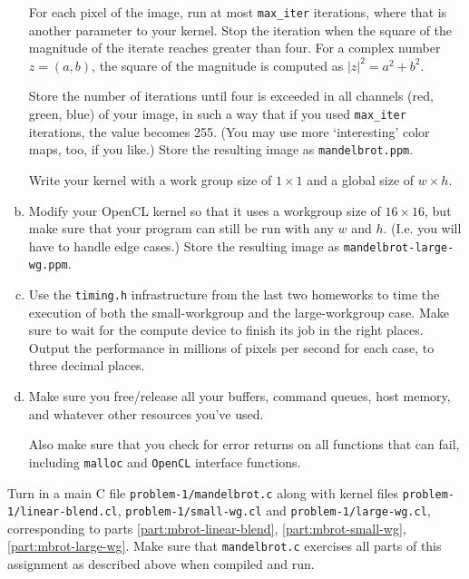 \documentclass[11pt]{article}
\begin{document}
\begin{enumerate}[a)]
    For each pixel of the image, run at most \texttt{max\_iter}
    iterations, where that is another parameter to your kernel. Stop
    the iteration when the square of the magnitude of the iterate
    reaches greater than four. For a complex number $z=(a,b)$, the
    square of the magnitude is computed as $|z|^2=a^2+b^2$.

    Store the number of iterations until four is exceeded in all
    channels (red, green, blue) of your image, in such a way that if
    you used \texttt{max\_iter} iterations, the value becomes 255.
    (You may use more `interesting' color maps, too, if you like.)
    Store the resulting image as \texttt{mandelbrot.ppm}.

    Write your kernel with a work group size of $1\times 1$ and a
    global size of $w\times h$.
    \label{part:mbrot-small-wg}

  \item Modify your OpenCL kernel so that it uses a workgroup size of
    $16\times 16$, but make sure that your program can still be run
    with any $w$ and $h$. (I.e. you will have to handle edge cases.)
    Store the resulting image as \texttt{mandelbrot-large-wg.ppm}.
    \label{part:mbrot-large-wg}

  \item Use the \texttt{timing.h} infrastructure from the last two
    homeworks to time the execution of both the small-workgroup and
    the large-workgroup case. Make sure to wait for the compute device
    to finish its job in the right places. Output the performance in
    millions of pixels per second for each case, to three decimal
    places.

  \item Make sure you free/release all your buffers, command queues, host
    memory, and whatever other resources you've used.

    Also make sure that you check for error returns on all functions
    that can fail, including \texttt{malloc} and \texttt{OpenCL}
    interface functions.
\end{enumerate}

Turn in a main C file \texttt{problem-1/mandelbrot.c} along with
kernel files \texttt{problem-1/linear-blend.cl},
\texttt{problem-1/small-wg.cl} and \texttt{problem-1/large-wg.cl},
corresponding to parts \ref{part:mbrot-linear-blend},
\ref{part:mbrot-small-wg}, \ref{part:mbrot-large-wg}. Make sure that
\texttt{mandelbrot.c} exercises all parts of this assignment as
described above when compiled and run.
\end{document}
